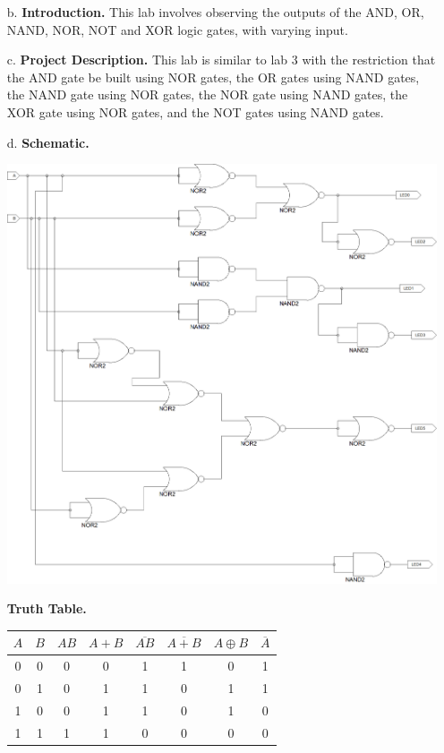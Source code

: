 \documentclass[9pt]{article}
\begin{document}
\begin{enumerate}
   \item[b.] \textbf{Introduction.} This lab involves observing the outputs of
             the AND, OR, NAND, NOR, NOT and XOR logic gates, with varying
             input.
   \item[c.] \textbf{Project Description.} This lab is similar to lab 3 with the
             restriction that the AND gate be built using NOR gates, the OR
             gates using NAND gates, the NAND gate using NOR gates, the NOR gate
             using NAND gates, the XOR gate using NOR gates, and the NOT gates
             using NAND gates.
  	\item[d.] \textbf{Schematic.}
             \begin{center}
                \includegraphics[width=\textwidth]{schematic.png}
             \end{center}
             
             \textbf{Truth Table.}   
   
   \begin{center}
    \begin{tabular}{@{}|c|c|c|c|c|c|c|c|@{}}
   \hline
   $A$ & $B$ & $AB$ & $A+B$ & $\overline{AB}$ & $\overline{A+B}$ & $A \oplus B$ & $\overline{A}$ \\ 
   \hline
   0 & 0 & 0 & 0 & 1 & 1 & 0 & 1 \\
   \hline
   0 & 1 & 0 & 1 & 1 & 0 & 1 & 1 \\
   \hline
   1 & 0 & 0 & 1 & 1 & 0 & 1 & 0 \\
   \hline
   1 & 1 & 1 & 1 & 0 & 0 & 0 & 0 \\
   \hline
\end{tabular}
   \end{center}
\end{enumerate}
\end{document}
